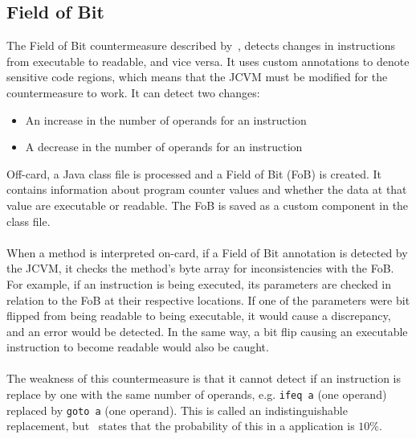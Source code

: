 \subsection{Field of Bit}
The Field of Bit countermeasure described by~\cite{evsmc}, detects changes in instructions from executable to readable, and vice versa. It uses custom annotations to denote sensitive code regions, which means that the JCVM must be modified for the countermeasure to work. It can detect two changes:

\begin{itemize}
\item An increase in the number of operands for an instruction
\item A decrease in the number of operands for an instruction
\end{itemize}
\noindent Off-card, a Java class file is processed and a Field of Bit (FoB) is created. It contains information about program counter values and whether the data at that value are executable or readable. The FoB is saved as a custom component in the class file.\\\\
When a method is interpreted on-card, if a Field of Bit annotation is detected by the JCVM, it checks the method's byte array for inconsistencies with the FoB. For example, if an instruction is being executed, its parameters are checked in relation to the FoB at their respective locations. If one of the parameters were bit flipped from being readable to being executable, it would cause a discrepancy, and an error would be detected. In the same way, a bit flip causing an executable instruction to become readable would also be caught.\\\\
The weakness of this countermeasure is that it cannot detect if an instruction is replace by one with the same number of operands, e.g. \texttt{ifeq a} (one operand) replaced by \texttt{goto a} (one operand). This is called an indistinguishable replacement, but~\cite[p. 54]{evsmc} states that the probability of this in a \jc application is $10\%$.